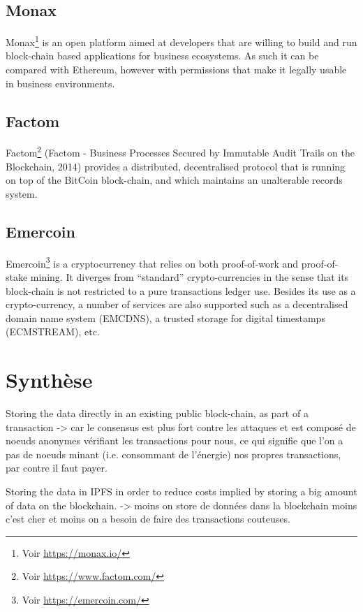\documentclass{tnreport}
\begin{document}
\subsection{Monax}

Monax\footnote{Voir \url{https://monax.io/}} is an open platform aimed at developers that are willing to build and run block-chain based applications for business ecosystems.
As such it can be compared with Ethereum, however with permissions that make it legally usable in business environments.

\subsection{Factom}

Factom\footnote{Voir \url{https://www.factom.com/}} (Factom - Business Processes Secured by Immutable Audit Trails on the Blockchain, 2014) provides a distributed, decentralised protocol that is running on top of the BitCoin block-chain, and which maintains an unalterable records system.

\subsection{Emercoin}

Emercoin\footnote{Voir \url{https://emercoin.com/}} is a cryptocurrency that relies on both proof-of-work and proof-of-stake mining. It diverges from “standard” crypto-currencies in the sense that its block-chain is not restricted to a pure transactions ledger use. Besides its use as a crypto-currency, a number of services are also supported such as a decentralised domain name system (EMCDNS), a trusted storage for digital timestamps (ECMSTREAM), etc.

\section{Synthèse}

Storing the data directly in an existing public block-chain, as part of a transaction
-> car le consensus est plus fort contre les attaques et est composé de noeuds anonymes vérifiant les transactions pour nous, ce qui signifie que l'on a pas de noeuds minant (i.e. consommant de l'énergie) nos propres transactions, par contre il faut payer.

Storing the data in IPFS in order to reduce costs implied by storing a big amount of data on the blockchain.
-> moins on store de données dans la blockchain moins c'est cher et moins on a besoin de faire des transactions couteuses.
\end{document}
